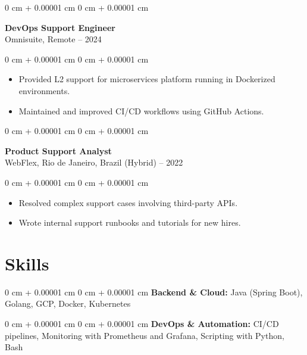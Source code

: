 \documentclass[10pt, letterpaper]{article}
\newenvironment{highlights}{
    \begin{itemize}[
        topsep=0.10 cm,
        parsep=0.10 cm,
        partopsep=0pt,
        itemsep=0pt,
        leftmargin=0 cm + 10pt
    ]
}{
    \end{itemize}
}
\newenvironment{onecolentry}{
    \begin{adjustwidth}{
        0 cm + 0.00001 cm
    }{
        0 cm + 0.00001 cm
    }
}{
    \end{adjustwidth}
}
\begin{document}
\vspace{0.2cm}

\begin{onecolentry}
    \setcolumnwidth{\fill, 4.5cm}
    \begin{paracol}{2}
        \textbf{DevOps Support Engineer} \\ Omnisuite, Remote
        \switchcolumn
         – 2024
    \end{paracol}
\end{onecolentry}
\vspace{0.10cm}
\begin{onecolentry}
    \begin{highlights}
                \item Provided L2 support for microservices platform running in Dockerized environments.
                \item Maintained and improved CI/CD workflows using GitHub Actions.
    \end{highlights}
\end{onecolentry}

\vspace{0.2cm}

\begin{onecolentry}
    \setcolumnwidth{\fill, 4.5cm}
    \begin{paracol}{2}
        \textbf{Product Support Analyst} \\ WebFlex, Rio de Janeiro, Brazil (Hybrid)
        \switchcolumn
         – 2022
    \end{paracol}
\end{onecolentry}
\vspace{0.10cm}
\begin{onecolentry}
    \begin{highlights}
                \item Resolved complex support cases involving third-party APIs.
                \item Wrote internal support runbooks and tutorials for new hires.
    \end{highlights}
\end{onecolentry}

\section{Skills}
\begin{onecolentry}{\textbf{Backend \& Cloud:} Java (Spring Boot), Golang, GCP, Docker, Kubernetes}\end{onecolentry}
\vspace{0.1cm}
\begin{onecolentry}{\textbf{DevOps \& Automation:} CI/CD pipelines, Monitoring with Prometheus and Grafana, Scripting with Python, Bash}\end{onecolentry}
\end{document}
